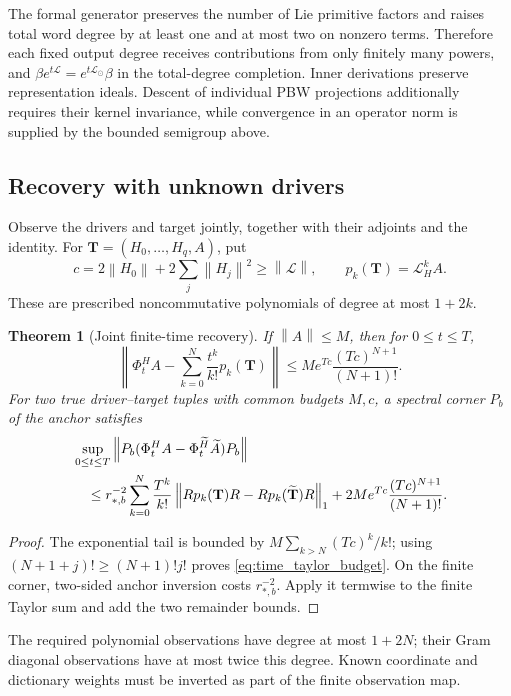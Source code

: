 \documentclass[11pt,a4paper]{amsart}
\numberwithin{equation}{section}
\newtheorem{theorem}{Theorem}[section]
\theoremstyle{definition}
\theoremstyle{remark}
\newcommand{\norm}[1]{\left\lVert#1\right\rVert}
\begin{document}
The formal generator preserves the number of Lie primitive factors and raises total word degree by at least one and at most two on nonzero terms. Therefore each fixed output degree receives contributions from only finitely many powers, and
$\beta e^{t\mathscr L}=e^{t\mathscr L_\odot}\beta$
in the total-degree completion. Inner derivations preserve representation ideals. Descent of individual PBW projections additionally requires their kernel invariance, while convergence in an operator norm is supplied by the bounded semigroup above.

\subsection{Recovery with unknown drivers}
Observe the drivers and target jointly, together with their adjoints and the identity. For $\mathbf T=(H_0,\ldots,H_q,A)$, put
\[
 c=2\norm{H_0}+2\sum_j\norm{H_j}^2\ge\norm{\mathcal L},\qquad
 p_k(\mathbf T)=\mathcal L_H^kA.
\]
These are prescribed noncommutative polynomials of degree at most $1+2k$.
\begin{theorem}[Joint finite-time recovery]\label{thm:finite_time_recovery}
If $\norm A\le M$, then for $0\le t\le T$,
\begin{equation}\label{eq:time_taylor_budget}
 \left\|\Phi_t^HA-\sum_{k=0}^N\frac{t^k}{k!}p_k(\mathbf T)\right\|
 \le Me^{Tc}\frac{(Tc)^{N+1}}{(N+1)!}.
\end{equation}
For two true driver--target tuples with common budgets $M,c$, a spectral corner $P_b$ of the anchor satisfies
\begin{align}\label{eq:time_joint_budget}
 &\sup_{0\le t\le T}\norm{P_b(\Phi_t^HA-\Phi_t^{\widetilde H}\widetilde A)P_b}\notag\\
 &\quad\le r_{*,b}^{-2}\sum_{k=0}^N\frac{T^k}{k!}
       \norm{Rp_k(\mathbf T)R-Rp_k(\widetilde{\mathbf T})R}_1
       +2Me^{Tc}\frac{(Tc)^{N+1}}{(N+1)!}.
\end{align}
\end{theorem}
\begin{proof}
The exponential tail is bounded by $M\sum_{k>N}(Tc)^k/k!$; using $(N+1+j)!\ge(N+1)!j!$ proves \eqref{eq:time_taylor_budget}. On the finite corner, two-sided anchor inversion costs $r_{*,b}^{-2}$. Apply it termwise to the finite Taylor sum and add the two remainder bounds.
\end{proof}
The required polynomial observations have degree at most $1+2N$; their Gram diagonal observations have at most twice this degree. Known coordinate and dictionary weights must be inverted as part of the finite observation map.
\end{document}
